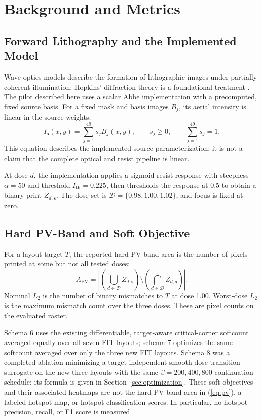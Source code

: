 \documentclass[conference]{IEEEtran}
\begin{document}
\section{Background and Metrics}
\subsection{Forward Lithography and the Implemented Model}
Wave-optics models describe the formation of lithographic images under partially coherent illumination; Hopkins' diffraction theory is a foundational treatment \cite{hopkins}. The pilot described here uses a scalar Abbe implementation with a precomputed, fixed source basis. For a fixed mask and basis images $B_j$, its aerial intensity is linear in the source weights:
\begin{equation}
 I_{\mathbf{s}}(x,y)=\sum_{j=1}^{49}s_j B_j(x,y),\qquad
 s_j\geq 0,\qquad \sum_{j=1}^{49}s_j=1.
 \label{eq:source}
\end{equation}
This equation describes the implemented source parameterization; it is not a claim that the complete optical and resist pipeline is linear.

At dose $d$, the implementation applies a sigmoid resist response with steepness $\alpha=50$ and threshold $I_{\mathrm{th}}=0.225$, then thresholds the response at 0.5 to obtain a binary print $Z_{d,\mathbf{s}}$. The dose set is $\mathcal{D}=\{0.98,1.00,1.02\}$, and focus is fixed at zero.

\subsection{Hard PV-Band and Soft Objective}
For a layout target $T$, the reported hard PV-band area is the number of pixels printed at some but not all tested doses:
\begin{equation}
 A_{\mathrm{PV}} =
 \left|\left(\bigcup_{d\in\mathcal{D}}Z_{d,\mathbf{s}}\right)
 \setminus
 \left(\bigcap_{d\in\mathcal{D}}Z_{d,\mathbf{s}}\right)\right|.
 \label{eq:pv}
\end{equation}
Nominal $L_2$ is the number of binary mismatches to $T$ at dose 1.00. Worst-dose $L_2$ is the maximum mismatch count over the three doses. These are pixel counts on the evaluated raster.

Schema 6 uses the existing differentiable, target-aware critical-corner softcount averaged equally over all seven FIT layouts; schema 7 optimizes the same softcount averaged over only the three new FIT layouts. Schema 8 was a completed ablation minimizing a target-independent smooth dose-transition surrogate on the new three layouts with the same $\beta=200,400,800$ continuation schedule; its formula is given in Section~\ref{sec:optimization}. These soft objectives and their associated heatmaps are not the hard PV-band area in (\ref{eq:pv}), a labeled hotspot map, or hotspot-classification scores. In particular, no hotspot precision, recall, or F1 score is measured.
\end{document}
